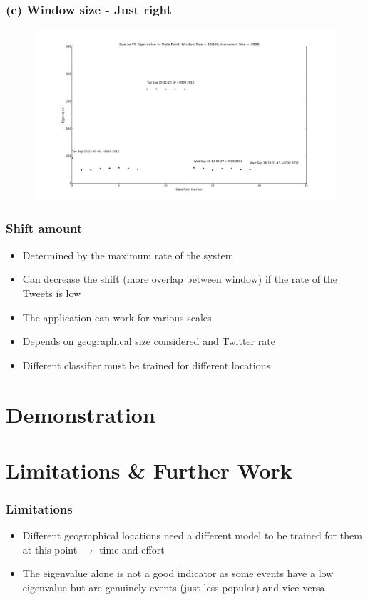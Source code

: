 \documentclass{beamer}
\begin{document}
\begin{frame}

\frametitle{(c) Window size - Just right}

\begin{figure}
\includegraphics[scale=0.2]{Testing_Streaming_App_15000_3000.png}
\end{figure}

\end{frame}

\begin{frame}
\frametitle{Shift amount}
\begin{itemize}
\item Determined by the maximum rate of the system
\item Can decrease the shift (more overlap between window) if the rate of the Tweets is low

\end{itemize}
\end{frame}

\begin{frame}
\begin{itemize}
\item The application can work for various scales
\item Depends on geographical size considered and Twitter rate
\item Different classifier must be trained for different locations

\end{itemize}
\end{frame}
\section{Demonstration}

\section{Limitations \& Further Work}
\begin{frame}
\frametitle{Limitations}
\begin{itemize}
\item Different geographical locations need a different model to be trained for them at this point $\rightarrow$ time and effort
\item The eigenvalue alone is not a good indicator as some events have a low eigenvalue but are genuinely events (just less popular) and vice-versa
\end{itemize}
\end{frame}
\end{document}
